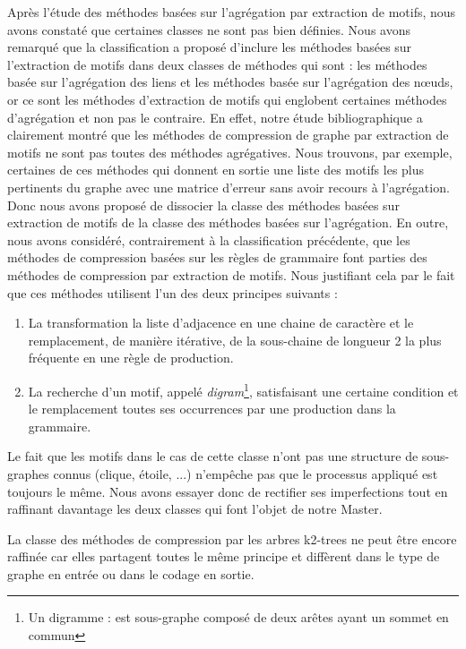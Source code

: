 Après l'étude des méthodes basées sur l'agrégation par extraction de motifs, nous avons constaté que certaines classes ne sont pas bien définies. Nous avons remarqué que la classification a proposé d'inclure les méthodes basées sur l'extraction de motifs dans deux classes de méthodes qui sont : les méthodes basée sur l'agrégation des liens et les méthodes  basée sur l'agrégation des nœuds, or ce sont les méthodes d'extraction de motifs qui englobent certaines méthodes d'agrégation et non pas le contraire. En effet, notre étude bibliographique a clairement montré que les méthodes de compression de graphe par extraction de motifs ne sont pas toutes des méthodes agrégatives. Nous trouvons, par exemple, certaines de ces méthodes qui donnent en sortie une liste des motifs les plus pertinents du graphe avec une matrice d'erreur sans avoir recours à l'agrégation. Donc nous avons proposé de dissocier la classe des méthodes basées sur extraction de motifs de la classe des méthodes basées sur l'agrégation.
En outre, nous avons considéré, contrairement à la classification précédente, que les méthodes de compression basées sur les règles de grammaire font parties des méthodes de compression par extraction de motifs. Nous justifiant cela par le fait que ces méthodes utilisent l'un des deux principes suivants : 
\begin{enumerate}
\item La transformation la liste d'adjacence en une chaine de caractère et le remplacement, de manière itérative, de la sous-chaine de longueur 2 la plus fréquente en une règle de production.
\item La recherche d'un motif, appelé \textit{digram}\footnote{Un digramme : est sous-graphe composé de deux arêtes ayant un sommet en commun}, satisfaisant une certaine condition et le remplacement toutes ses occurrences par une production dans la grammaire. 
\end{enumerate}
Le fait que les motifs dans le cas de cette classe n'ont pas une structure de sous-graphes connus (clique, étoile, ...) n'empêche pas que le processus appliqué est toujours le même. Nous avons essayer donc de rectifier ses imperfections tout en raffinant davantage les deux classes qui font l'objet de notre Master. 

La classe des méthodes de compression par les arbres k2-trees ne peut être encore raffinée car elles partagent toutes le même principe et diffèrent dans le type de graphe en entrée ou dans le codage en sortie.

